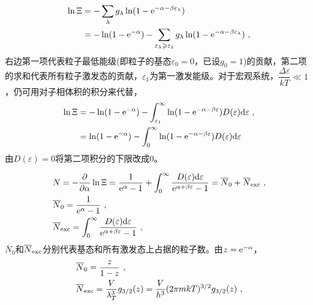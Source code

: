 \documentclass[12pt,a4paper]{article}
\newcommand{\dif}{\mathrm{d}}
\begin{document}
\begin{align}
\nonumber \ln { \Xi} &= -\sum_\lambda g_\lambda \ln(1 -{\rm e}^{-\alpha -\beta \varepsilon_\lambda}) \\
&= -\ln(1-{\rm e}^{-\alpha}) -\sum_{\varepsilon_\lambda \geqslant \varepsilon_1} g_\lambda \ln (1 -{\rm e}^{-\alpha -\beta \varepsilon_\lambda}) ~,
\end{align}
右边第一项代表粒子最低能级(即粒子的基态$\varepsilon_0 = 0$，已设$g_0 = 1$)的贡献，第二项的求和代表所有粒子激发态的贡献，$\varepsilon_1$为第一激发能级。对于宏观系统，$\dfrac{\Delta\varepsilon}{kT} \ll 1 $，仍可用对子相体积的积分来代替，
\begin{align}
\nonumber \ln { \Xi} &= -\ln(1-{\rm e}^{-\alpha}) - \int_{\varepsilon_1}^\infty \ln (1 -{\rm e}^{-\alpha -\beta \varepsilon}) D(\varepsilon) \dif \varepsilon ~, \\
&= \ln(1-{\rm e}^{-\alpha}) - \int_{0}^\infty \ln (1 -{\rm e}^{-\alpha -\beta \varepsilon}) D(\varepsilon) \dif \varepsilon
\end{align}
由$D(\varepsilon) = 0$将第二项积分的下限改成$0$。

\begin{align}
& N = -\dfrac{\partial }{\partial \alpha} \ln { \Xi} = \dfrac{1}{{\rm e}^{\alpha} -1} + \int_0^\infty \dfrac{D(\varepsilon) \dif \varepsilon}{{\rm e}^{\alpha +\beta \varepsilon} -1} = \overline{N}_0 +\overline{N}_{\rm exc} ~, \\
& \overline{N}_0 = \dfrac{1}{{\rm e}^{\alpha} -1} ~, \\
& \overline{N}_{\rm exc} = \int_0^\infty \dfrac{D(\varepsilon) \dif \varepsilon}{{\rm e}^{\alpha +\beta \varepsilon} -1} ~,
\end{align}
$\overline{N}_0$和$\overline{N}_{\rm exc}$分别代表基态和所有激发态上占据的粒子数。由$z = {\rm e}^{-\alpha}$，
\begin{align}
& \overline{N}_0 = \dfrac{z}{1-z} ~, \\
& \overline{N}_{\rm exc} = \dfrac{V}{\lambda^3_T} g_{3/2}(z) = \dfrac{V}{h^3} (2\pi m kT)^{3/2} g_{3/2}(z) ~,
\end{align}
\end{document}
